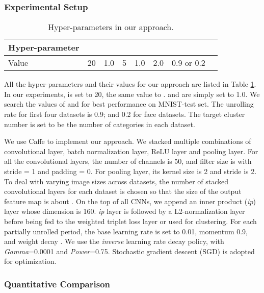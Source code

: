 \documentclass[10pt,twocolumn,letterpaper]{article}
\begin{document}
\subsubsection{Experimental Setup}
\begin{table}
\caption{{{Hyper-parameters in our approach.}}}
\vspace{-15pt}
\small
\center
\begin{tabular}{@{} l  c  c  c c  c  c  c @{}}
\toprule 
  Hyper-parameter &  &  &  &  &  &    \\
  \midrule
  Value  & 20    & 1.0   & 5  & 1.0 & 2.0  & 0.9 {or} 0.2    \\
  \bottomrule
\end{tabular}
\label{TB_AC_Param}
\end{table}

{All the {hyper-parameters} and their values {for our approach} are listed in Table \ref{TB_AC_Param}. {In our experiments,  is set to 20, the same value to \cite{zhang2012graph}.  and  are simply set to 1.0. We search the values of  and  for best performance on MNIST-test set.} The unrolling rate  for first four datasets is 0.9; and 0.2 for face datasets. The target cluster number  is set to be the number of categories in each dataset.}

We use Caffe \cite{jia2014caffe} to implement our approach. We stacked multiple combinations of convolutional layer, batch normalization layer, ReLU layer and pooling layer. For all the convolutional layers, the number of channels is 50, and filter size is  with stride = 1 and padding = 0. For pooling layer, its kernel size is 2 and stride is 2. To deal with varying image sizes across datasets, the number of stacked convolutional layers for each dataset is chosen so that the size of the output feature map is about . On the top of all CNNs, we append an inner product (\textit{ip}) layer whose dimension is 160. \textit{ip} layer is followed by a L2-normalization layer before {being} fed to the weighted triplet loss layer or used for clustering. For each partially unrolled period, the base learning rate is set to 0.01, momentum 0.9, and weight decay . {We use the \textit{inverse} learning rate decay policy, with \textit{Gamma}=0.0001 and \textit{Power}=0.75. {Stochastic gradient descent (SGD)} is adopted for optimization.}

\subsubsection{Quantitative Comparison}
\end{document}
